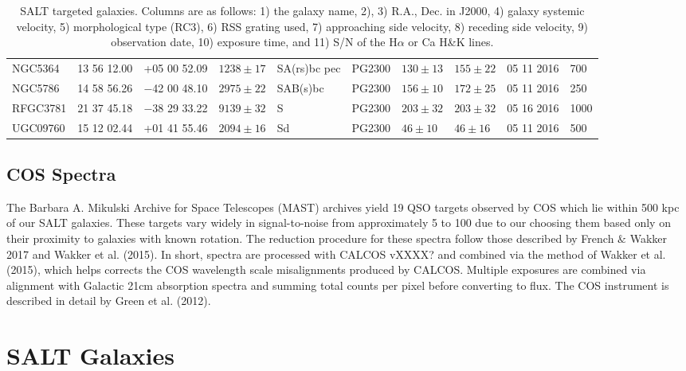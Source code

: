 \documentclass[iop]{emulateapj-rtx4}
\begin{document}
\begin{table}[ht]
\begin{center}
\begin{tabular}{l l l l l l l l l l}
 NGC5364	 	& 13 56 12.00		& +05 00 52.09		& $1238 \pm17$	& SA(rs)bc pec	& PG2300		& $130 \pm 13$	& $155 \pm 22$		& 05 11 2016	& 700			\\ %
 
 NGC5786	 	& 14 58 56.26		& $-$42 00 48.10	& $2975 \pm22$	& SAB(s)bc	& PG2300		& $156 \pm 10$	& $172 \pm 25$		& 05 11 2016	& 250			\\ %

 RFGC3781	 	& 21 37 45.18		& $-$38 29 33.22	& $9139 \pm32$	& S			& PG2300		& $203 \pm 32$	& $203 \pm 32$		& 05 16 2016	& 1000			\\ %

 UGC09760	 	& 15 12 02.44		& +01 41 55.46		& $2094 \pm16$	& Sd			& PG2300		& $46 \pm 10$		& $46 \pm 16$			& 05 11 2016	& 500			\\


 \hline

\end{tabular}
\end{center}
  \caption{\small{SALT targeted galaxies. Columns are as follows: 1) the galaxy name, 2), 3) R.A., Dec. in J2000, 4) galaxy systemic velocity, 5) morphological type (RC3), 6) RSS grating used, 7) approaching side velocity, 8) receding side velocity, 9) observation date, 10) exposure time, and 11) S/N of the H$\alpha$ or Ca H\&K lines.}}
  \label{salt_targets}
\end{table}

\subsection{COS Spectra}
The Barbara A. Mikulski Archive for Space Telescopes (MAST) archives yield 19 QSO targets observed by COS which lie within 500 kpc of our SALT galaxies. These targets vary widely in signal-to-noise from approximately 5 to 100 due to our choosing them based only on their proximity to galaxies with known rotation. The reduction procedure for these spectra follow those described by French $\&$ Wakker 2017 and Wakker et al. (2015). In short, spectra are processed with CALCOS vXXXX? and combined via the method of Wakker et al. (2015), which helps corrects the COS wavelength scale misalignments produced by CALCOS. Multiple exposures are combined via alignment with Galactic 21cm absorption spectra and summing total counts per pixel before converting to flux. The COS instrument is described in detail by Green et al. (2012).


\section{SALT Galaxies}
\end{document}
